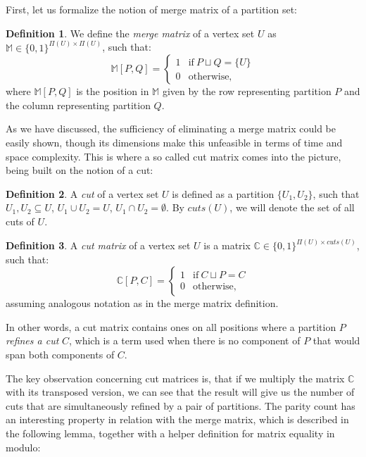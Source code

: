 \documentclass[thesis=M,english,hidelinks]{FITthesis}[2012/10/20]
\theoremstyle{definition}
\newtheorem{definition}{Definition}
\begin{document}
First, let us formalize the notion of merge matrix of a partition set:

\begin{definition}
    We define the \emph{merge matrix} of a vertex set $U$ as $\mathbb{M} \in \{0, 1\}^{\Pi(U) \times \Pi(U)}$, such that:
    $$
    \mathbb{M}[P, Q] = 
    \begin{cases}
        1 & \text{if}\ P \sqcup Q = \{U\} \\
        0 & \text{otherwise,}
    \end{cases}
    $$
    where $\mathbb{M}[P, Q]$ is the position in $\mathbb{M}$ given by the row representing partition $P$ and the column
    representing partition $Q$.
\end{definition}

As we have discussed, the sufficiency of eliminating a merge matrix could be easily shown, though its dimensions make
this unfeasible in terms of time and space complexity. This is where a so called cut matrix comes into the picture,
being built on the notion of a cut:

\begin{definition}
    A \emph{cut} of a vertex set $U$ is defined as a partition $\{U_1, U_2\}$, such that $U_1, U_2
    \subseteq U$, $U_1 \cup U_2 = U$, $U_1 \cap U_2 = \emptyset$.  By $cuts(U)$, we will denote the set of all cuts
    of $U$.
\end{definition}

\begin{definition}
    \label{def:cutmatrix}
    A \emph{cut matrix} of a vertex set $U$ is a matrix $\mathbb{C} \in \{0, 1\}^{\Pi(U) \times cuts(U)}$, such that:
    $$
    \mathbb{C}[P, C] = 
    \begin{cases}
        1 & \text{if}\ C \sqcup P = C \\
        0 & \text{otherwise,}
    \end{cases}
    $$
    assuming analogous notation as in the merge matrix definition.
\end{definition}

In other words, a cut matrix contains ones on all positions where a partition $P$ \emph{refines a cut} $C$, which is a
term used when there is no component of $P$ that would span both components of $C$.

The key observation concerning cut matrices is, that if we multiply the matrix $\mathbb{C}$ with its transposed
version, we can see that the result will give us the number of cuts that are simultaneously refined by a pair of
partitions. The parity count has an interesting property in relation with the merge matrix, which is described in the
following lemma, together with a helper definition for matrix equality in modulo:
\end{document}
